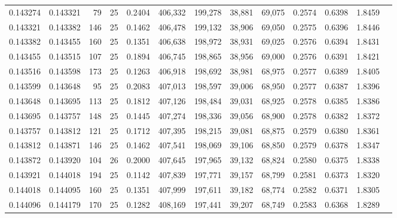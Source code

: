 \begin{tabular}{rrrrrrrrrrrrr}
0.143274 & 0.143321 &    79 &  25 &                                     0.2404 & 406,332 & 199,278 &  38,881 &  69,075 & 0.2574 & 0.6398 & 1.8459 \\
0.143321 & 0.143382 &   146 &  25 &                                     0.1462 & 406,478 & 199,132 &  38,906 &  69,050 & 0.2575 & 0.6396 & 1.8446 \\
0.143382 & 0.143455 &   160 &  25 &                                     0.1351 & 406,638 & 198,972 &  38,931 &  69,025 & 0.2576 & 0.6394 & 1.8431 \\
0.143455 & 0.143515 &   107 &  25 &                                     0.1894 & 406,745 & 198,865 &  38,956 &  69,000 & 0.2576 & 0.6391 & 1.8421 \\
0.143516 & 0.143598 &   173 &  25 &                                     0.1263 & 406,918 & 198,692 &  38,981 &  68,975 & 0.2577 & 0.6389 & 1.8405 \\
0.143599 & 0.143648 &    95 &  25 &                                     0.2083 & 407,013 & 198,597 &  39,006 &  68,950 & 0.2577 & 0.6387 & 1.8396 \\
0.143648 & 0.143695 &   113 &  25 &                                     0.1812 & 407,126 & 198,484 &  39,031 &  68,925 & 0.2578 & 0.6385 & 1.8386 \\
0.143695 & 0.143757 &   148 &  25 &                                     0.1445 & 407,274 & 198,336 &  39,056 &  68,900 & 0.2578 & 0.6382 & 1.8372 \\
0.143757 & 0.143812 &   121 &  25 &                                     0.1712 & 407,395 & 198,215 &  39,081 &  68,875 & 0.2579 & 0.6380 & 1.8361 \\
0.143812 & 0.143871 &   146 &  25 &                                     0.1462 & 407,541 & 198,069 &  39,106 &  68,850 & 0.2579 & 0.6378 & 1.8347 \\
0.143872 & 0.143920 &   104 &  26 &                                     0.2000 & 407,645 & 197,965 &  39,132 &  68,824 & 0.2580 & 0.6375 & 1.8338 \\
0.143921 & 0.144018 &   194 &  25 &                                     0.1142 & 407,839 & 197,771 &  39,157 &  68,799 & 0.2581 & 0.6373 & 1.8320 \\
0.144018 & 0.144095 &   160 &  25 &                                     0.1351 & 407,999 & 197,611 &  39,182 &  68,774 & 0.2582 & 0.6371 & 1.8305 \\
0.144096 & 0.144179 &   170 &  25 &                                     0.1282 & 408,169 & 197,441 &  39,207 &  68,749 & 0.2583 & 0.6368 & 1.8289 \\

\end{tabular}
